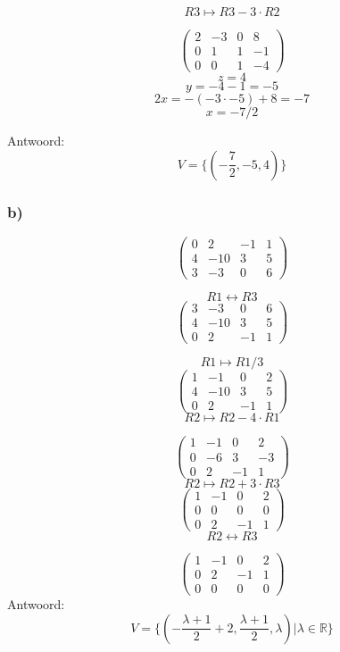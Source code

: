 \documentclass[10pt,a4paper]{article}
\begin{document}
\[ R3 \longmapsto R3 - 3\cdot R2\]

\[
\begin{pmatrix}
2 & -3 & 0 & 8\\
0 & 1 & 1 & -1\\
0 & 0 & 1 & -4
\end{pmatrix}
\]
\[
z = 4\]
\[y = -4-1 = -5\]
\[2x = -(-3\cdot -5) + 8=-7\]
\[ x = -7/2\]

Antwoord:
\[
V = \{(-\frac{7}{2},-5,4)\}
\]

\subsubsection*{b)}
\[
\begin{pmatrix}
0 & 2 & -1 & 1\\
4 & -10 & 3 & 5\\
3 & -3 & 0 & 6
\end{pmatrix}
\]

\[ R1 \leftrightarrow R3\]
\[
\begin{pmatrix}
3 & -3 & 0 & 6\\
4 & -10 & 3 & 5\\
0 & 2 & -1 & 1
\end{pmatrix}
\]

\[ R1 \longmapsto R1 / 3\]
\[
\begin{pmatrix}
1 & -1 & 0 & 2\\
4 & -10 & 3 & 5\\
0 & 2 & -1 & 1
\end{pmatrix}
\]
\[ R2 \longmapsto R2 - 4\cdot R1\]

\[
\begin{pmatrix}
1 & -1 & 0 & 2\\
0 & -6 & 3 & -3\\
0 & 2 & -1 & 1
\end{pmatrix}
\]
\[ R2 \longmapsto R2 + 3\cdot R3\]
\[
\begin{pmatrix}
1 & -1 & 0 & 2\\
0 & 0 & 0 & 0\\
0 & 2 & -1 & 1
\end{pmatrix}
\]
\[ R2 \leftrightarrow R3\]

\[
\begin{pmatrix}
1 & -1 & 0 & 2\\
0 & 2 & -1 & 1\\
0 & 0 & 0 & 0
\end{pmatrix}
\]
Antwoord:
\[
V = \{(-\frac{\lambda+1}{2} + 2,\frac{\lambda+1}{2},\lambda) | \lambda \in \mathbb{R}\}
\]
\end{document}
